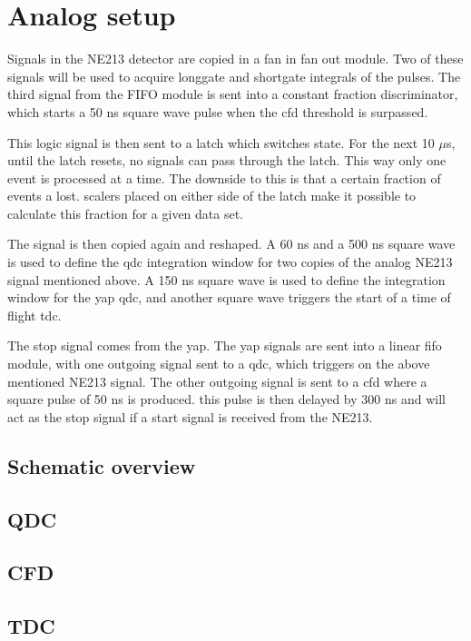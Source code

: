 \documentclass[main.tex]{subfiles}
\begin{document}
\section{Analog setup}
Signals in the NE213 detector are copied in a fan in fan out module. Two of these signals will be used to acquire longgate and shortgate integrals of the pulses. %
The third signal from the FIFO module is sent into a constant fraction discriminator, which starts a 50 ns square wave pulse when the cfd threshold is surpassed. %

This logic signal is then sent to a latch which switches state. For the next 10 $\mu$s, until the latch resets, no signals can pass through the latch. This way only one event is processed at a time. The downside to this is that a certain fraction of events a lost. scalers placed on either side of the latch make it possible to calculate this fraction for a given data set.

The signal is then copied again and reshaped. A 60 ns and a 500 ns square wave is used to define the qdc integration window for two copies of the analog NE213 signal mentioned above. A 150 ns square wave is used to define the integration window for the yap qdc, and another square wave triggers the start of a time of flight tdc.

The stop signal comes from the yap. The yap signals are sent into a linear fifo module, with one outgoing signal sent to a qdc, which triggers on the above mentioned NE213 signal. %
The other outgoing signal is sent to a cfd where a square pulse of 50 ns is produced. this pulse is then delayed by 300 ns and will act as the stop signal if a start signal is received from the NE213. %


\subsection{Schematic overview}
\subsection{QDC}
\subsection{CFD}
\subsection{TDC}
\end{document}
